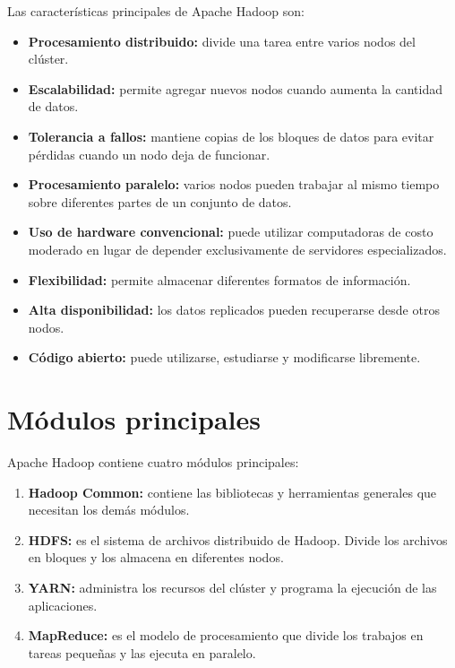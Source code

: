 Las características principales de Apache Hadoop son:

\begin{itemize}
    \item \textbf{Procesamiento distribuido:} divide una tarea entre varios
    nodos del clúster.

    \item \textbf{Escalabilidad:} permite agregar nuevos nodos cuando aumenta
    la cantidad de datos.

    \item \textbf{Tolerancia a fallos:} mantiene copias de los bloques de datos
    para evitar pérdidas cuando un nodo deja de funcionar.

    \item \textbf{Procesamiento paralelo:} varios nodos pueden trabajar al
    mismo tiempo sobre diferentes partes de un conjunto de datos.

    \item \textbf{Uso de hardware convencional:} puede utilizar computadoras
    de costo moderado en lugar de depender exclusivamente de servidores
    especializados.

    \item \textbf{Flexibilidad:} permite almacenar diferentes formatos de
    información.

    \item \textbf{Alta disponibilidad:} los datos replicados pueden recuperarse
    desde otros nodos.

    \item \textbf{Código abierto:} puede utilizarse, estudiarse y modificarse
    libremente.
\end{itemize}

\section{Módulos principales}

Apache Hadoop contiene cuatro módulos principales:

\begin{enumerate}
    \item \textbf{Hadoop Common:} contiene las bibliotecas y herramientas
    generales que necesitan los demás módulos.

    \item \textbf{HDFS:} es el sistema de archivos distribuido de Hadoop.
    Divide los archivos en bloques y los almacena en diferentes nodos.

    \item \textbf{YARN:} administra los recursos del clúster y programa la
    ejecución de las aplicaciones.

    \item \textbf{MapReduce:} es el modelo de procesamiento que divide los
    trabajos en tareas pequeñas y las ejecuta en paralelo.
\end{enumerate}

